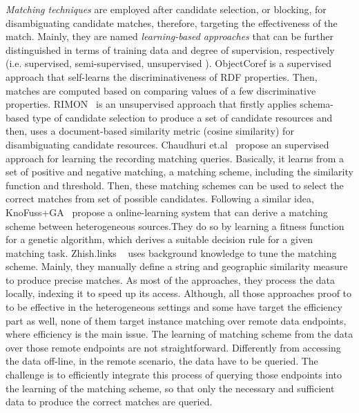 \emph{Matching techniques} are employed after candidate selection, or blocking, for disambiguating candidate matches, therefore, targeting the effectiveness of the match. Mainly, they are named \emph{learning-based approaches} that can be further distinguished in terms of training data and degree of supervision, respectively (i.e. supervised, semi-supervised, unsupervised \cite{bernstein_discovering_2009,Song:2011:AGD:2063016.2063058,Niu:2011:ZWC:2063076.2063091}). ObjectCoref\cite{hu_bootstrapping_2011} is a supervised approach that self-learns the discriminativeness of RDF properties. Then, matches are computed based on comparing values of a few discriminative properties. RIMON~\cite{juanzi_li_rimom:_2009} is an unsupervised approach that firstly applies schema-based type of candidate selection to produce a set of candidate resources and then, uses a document-based similarity metric (cosine similarity) for disambiguating candidate resources. Chaudhuri et.al~\cite{DBLP:conf/vldb/ChaudhuriCGK07} propose an supervised approach for learning the recording matching queries. Basically, it learns from a set of positive and negative matching, a matching scheme, including the similarity function and threshold. Then, these matching schemes can be used to select the correct matches from set of possible candidates. Following a similar idea, KnoFuss+GA~\cite{DBLP:conf/esws/NikolovdM12} propose a online-learning system that can derive a matching scheme between heterogeneous sources.They do so by learning a fitness function for a genetic algorithm, which derives a suitable decision rule for a given matching task. Zhish.links ~\cite{DBLP:conf/semweb/NiuRZW11} uses background knowledge to tune the matching scheme. Mainly, they manually define a string and geographic similarity measure to produce precise matches. As most of the approaches, they process the data locally, indexing it to speed up its access. Although, all those approaches proof to to be effective in the heterogeneous settings and some have target the efficiency part as well, none of them target instance matching over remote data endpoints, where efficiency is the main issue. The learning of matching scheme from the data over those remote endpoints are not straightforward. Differently from accessing the data off-line, in the remote scenario, the data have to be queried. The challenge is to efficiently integrate this process of querying those endpoints into the learning of the matching scheme, so that only the necessary and sufficient data to produce the correct matches are queried. 

